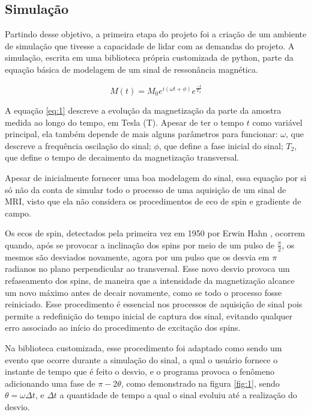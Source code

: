 \documentclass{article}
\begin{document}
\subsection{Simulação}

Partindo desse objetivo, a primeira etapa do projeto foi a criação de um ambiente de simulação
que tivesse a capacidade de lidar com as demandas do projeto. A simulação, escrita em uma biblioteca 
própria customizada de python, parte da equação básica de modelagem de um sinal de ressonância magnética.

\begin{equation} \label{eq:1}
    M(t) = M_0 e^{i(\omega t + \phi)} e^{\frac{-t}{T_2}}
\end{equation}

A equação \ref{eq:1} descreve a evolução da magnetização da parte da amostra medida ao longo do tempo, em Tesla (T). 
Apesar de ter o tempo $t$ como variável principal, ela também depende de mais alguns parâmetros para 
funcionar: $\omega$, que descreve a frequência oscilação do sinal; $\phi$, que define a fase inicial do 
sinal; $T_2$, que define o tempo de decaimento da magnetização transversal. 

Apesar de inicialmente fornecer uma boa modelagem do sinal, essa equação por si só não da conta de simular todo o processo de 
uma aquisição de um sinal de MRI, visto que ela não considera os procedimentos de eco de spin e gradiente de campo. 

Os ecos de spin, detectados pela primeira vez em 1950 por Erwin Hahn \cite{PhysRev.80.580}, ocorrem quando, após se provocar a 
inclinação dos spins por meio de um pulso de $\frac{\pi}{2}$, os mesmos são desviados novamente, agora por um pulso que os desvia em 
$\pi$ radianos no plano perpendicular ao transversal. Esse novo desvio provoca um refaseamento dos spins, de maneira que a intensidade
da magnetização alcance um novo máximo antes de decair novamente, como se todo o processo fosse reiniciado. Esse procedimento é 
essencial nos processos de aquisição de sinal pois permite a redefinição do tempo inicial de captura dos sinal, evitando qualquer erro 
associado ao início do procedimento de excitação dos spins.

Na biblioteca customizada, esse procedimento foi adaptado como sendo um evento que ocorre durante a simulação do sinal, a qual o 
usuário fornece o instante de tempo que é feito o desvio, e o programa provoca o fenômeno adicionando uma fase de $\pi - 2\theta$, 
como demonstrado na figura \ref{fig:1}, sendo $\theta = \omega \Delta t$, e $\Delta t$ a quantidade de tempo a qual o sinal evoluiu 
até a realização do desvio.   
\end{document}
